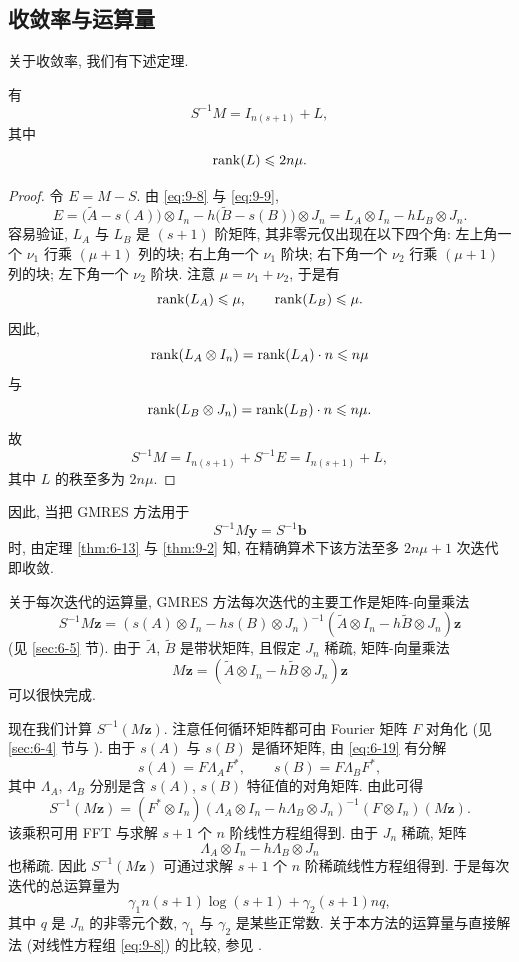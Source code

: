\subsection{收敛率与运算量}
\label{sec:9-3-2}

关于收敛率, 我们有下述定理.

\begin{theorem}
\label{thm:9-2}
有
\[
  S^{-1}M=I_{n(s+1)}+L,
\]
其中
\[
  \operatorname{rank}(L)\leqslant2n\mu.
\]
\end{theorem}

\begin{proof}
令 $E=M-S$. 由 \eqref{eq:9-8} 与 \eqref{eq:9-9},
\[
  E=\bigl(\widetilde{A}-s(A)\bigr)\otimes I_n
  -h\bigl(\widetilde{B}-s(B)\bigr)\otimes J_n
  =L_A\otimes I_n-hL_B\otimes J_n.
\]
容易验证, $L_A$ 与 $L_B$ 是 $(s+1)$ 阶矩阵, 其非零元仅出现在以下四个角: 左上角一个 $\nu_1$ 行乘 $(\mu+1)$ 列的块; 右上角一个 $\nu_1$ 阶块; 右下角一个 $\nu_2$ 行乘 $(\mu+1)$ 列的块; 左下角一个 $\nu_2$ 阶块. 注意 $\mu=\nu_1+\nu_2$, 于是有
\[
  \operatorname{rank}(L_A)\leqslant\mu,\qquad \operatorname{rank}(L_B)\leqslant\mu.
\]
因此,
\[
  \operatorname{rank}(L_A\otimes I_n)=\operatorname{rank}(L_A)\cdot n\leqslant n\mu
\]
与
\[
  \operatorname{rank}(L_B\otimes J_n)=\operatorname{rank}(L_B)\cdot n\leqslant n\mu.
\]
故
\[
  S^{-1}M=I_{n(s+1)}+S^{-1}E=I_{n(s+1)}+L,
\]
其中 $L$ 的秩至多为 $2n\mu$.
\end{proof}

因此, 当把 GMRES 方法用于
\[
  S^{-1}M\mathbf{y}=S^{-1}\mathbf{b}
\]
时, 由定理 \ref{thm:6-13} 与 \ref{thm:9-2} 知, 在精确算术下该方法至多 $2n\mu+1$ 次迭代即收敛.

关于每次迭代的运算量, GMRES 方法每次迭代的主要工作是矩阵-向量乘法
\[
  S^{-1}M\mathbf{z}
  =(s(A)\otimes I_n-hs(B)\otimes J_n)^{-1}
   (\widetilde{A}\otimes I_n-h\widetilde{B}\otimes J_n)\mathbf{z}
\]
(见 \ref{sec:6-5} 节). 由于 $\widetilde{A}$, $\widetilde{B}$ 是带状矩阵, 且假定 $J_n$ 稀疏, 矩阵-向量乘法
\[
  M\mathbf{z}=(\widetilde{A}\otimes I_n-h\widetilde{B}\otimes J_n)\mathbf{z}
\]
可以很快完成.

现在我们计算 $S^{-1}(M\mathbf{z})$. 注意任何循环矩阵都可由 Fourier 矩阵 $F$ 对角化 (见 \ref{sec:6-4} 节与 \cite{src:29}). 由于 $s(A)$ 与 $s(B)$ 是循环矩阵, 由 \eqref{eq:6-19} 有分解
\[
  s(A)=F\Lambda_AF^*,\qquad s(B)=F\Lambda_BF^*,
\]
其中 $\Lambda_A$, $\Lambda_B$ 分别是含 $s(A)$, $s(B)$ 特征值的对角矩阵. 由此可得
\[
  S^{-1}(M\mathbf{z})
  =(F^*\otimes I_n)(\Lambda_A\otimes I_n-h\Lambda_B\otimes J_n)^{-1}
   (F\otimes I_n)(M\mathbf{z}).
\]
该乘积可用 FFT 与求解 $s+1$ 个 $n$ 阶线性方程组得到. 由于 $J_n$ 稀疏, 矩阵
\[
  \Lambda_A\otimes I_n-h\Lambda_B\otimes J_n
\]
也稀疏. 因此 $S^{-1}(M\mathbf{z})$ 可通过求解 $s+1$ 个 $n$ 阶稀疏线性方程组得到. 于是每次迭代的总运算量为
\[
  \gamma_1n(s+1)\log(s+1)+\gamma_2(s+1)nq,
\]
其中 $q$ 是 $J_n$ 的非零元个数, $\gamma_1$ 与 $\gamma_2$ 是某些正常数. 关于本方法的运算量与直接解法 (对线性方程组 \eqref{eq:9-8}) 的比较, 参见 \cite{src:19}.

